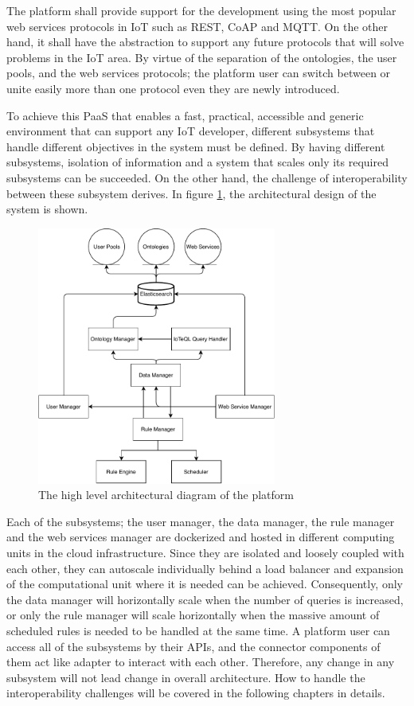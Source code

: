 The platform shall provide support for the development using the most popular web services protocols in IoT such as REST, CoAP and MQTT. On the other hand, it shall have the abstraction to support any future protocols that will solve problems in the IoT area. By virtue of the separation of the ontologies, the user pools, and the web services protocols; the platform user can switch between or unite easily more than one protocol even they are newly introduced.

To achieve this PaaS that enables a fast, practical, accessible and generic environment that can support any IoT developer, different subsystems that handle different objectives in the system must be defined. By having different subsystems,  isolation of information and a system that scales only its required subsystems can be succeeded. On the other hand, the challenge of interoperability between these subsystem derives. In figure \ref{fig:architecture}, the architectural design of the system is shown.
\clearpage
\begin{figure}[h]
  \centering
  \includegraphics[width=0.7\textwidth,height=\textheight,keepaspectratio]{figures/high_level_architectural_diagram.pdf}
  \caption[Platform Architecture]{The high level architectural diagram of the platform}\label{fig:architecture}
\end{figure}

Each of the subsystems; the user manager, the data manager, the rule manager and the web services manager are dockerized and hosted in different computing units in the cloud infrastructure. Since they are isolated and loosely coupled with each other, they can autoscale individually behind a load balancer and expansion of the computational unit where it is needed can be achieved. Consequently, only the data manager will horizontally scale when the number of queries is increased, or only the rule manager will scale horizontally when the massive amount of scheduled rules is needed to be handled at the same time. A platform user can access all of the subsystems by their APIs, and the connector components of them act like adapter to interact with each other. Therefore, any change in any subsystem will not lead change in overall architecture. How to handle the interoperability challenges will be covered in the following chapters in details.


